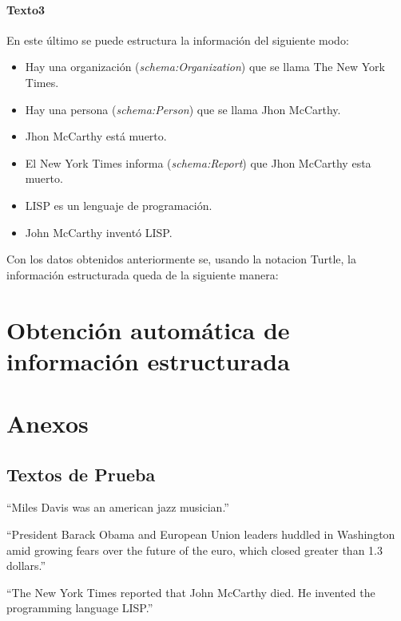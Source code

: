 \documentclass[spanish]{llncs}   %
\begin{document}
\paragraph{Texto3}

En este último se  puede estructura la información del siguiente modo:

\begin{itemize}
    \item Hay una organización (\textit{schema:Organization}) que se llama The New York Times.
    \item Hay una persona (\textit{schema:Person}) que se llama Jhon McCarthy.
    \item Jhon McCarthy está muerto.
    \item El New York Times informa (\textit{schema:Report}) que Jhon McCarthy esta muerto.
    \item LISP es un lenguaje de programación.
    \item John McCarthy inventó LISP.
\end{itemize}

Con los datos obtenidos anteriormente se, usando la notacion Turtle, la información estructurada queda de la siguiente manera:



\section{Obtención automática de información estructurada}

\section{Anexos}

\subsection{Textos de Prueba}\label{Textos}

“Miles Davis was an american jazz musician.”

“President Barack Obama and European Union leaders huddled in Washington amid growing fears over the future of the euro, which closed greater than 1.3 dollars.”

“The New York Times reported that John McCarthy died. He invented the programming language LISP.”
\end{document}
